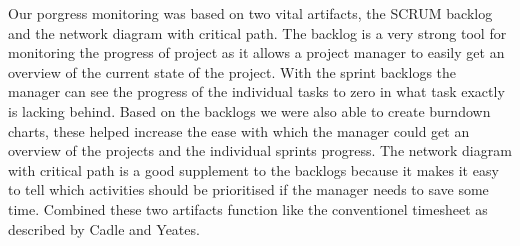 Our porgress monitoring was based on two vital artifacts, the SCRUM backlog and the network diagram with critical path. The backlog is a very strong tool for monitoring the progress of project as it allows a project manager to easily get an overview of the current state of the project. With the sprint backlogs the manager can see the progress of the individual tasks to zero in what task exactly is lacking behind. Based on the backlogs we were also able to create burndown charts, these helped increase the ease with which the manager could get an overview of the projects and the individual sprints progress. The network diagram with critical path is a good supplement to the backlogs because it makes it easy to tell which activities should be prioritised if the manager needs to save some time. Combined these two artifacts function like the conventionel timesheet as described by Cadle and Yeates.

